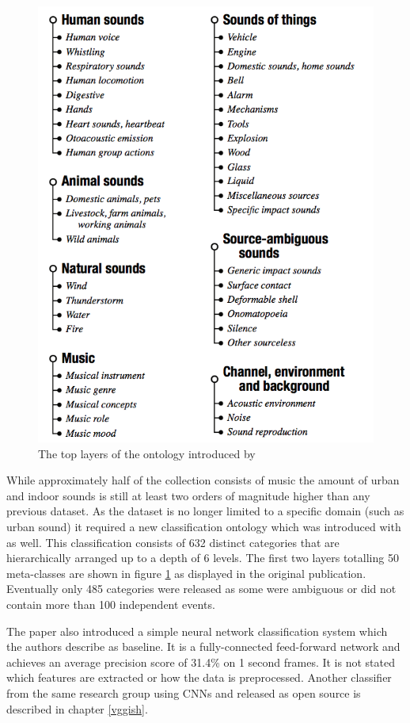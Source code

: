 \begin{figure}
    \centering
    \vspace{-10pt}
	\includegraphics[width=.45\textwidth]{./images/illustrations/audioset}
    \caption{The top layers of the ontology introduced by \cite{45857}}
	\label{fig:audioset}
\end{figure}


While approximately half of the collection consists of music the amount of urban and indoor sounds is still at least two orders of magnitude higher than any previous dataset. As the dataset is no longer limited to a specific domain (such as urban sound) it required a new classification ontology which was introduced with \cite{45857} as well. This classification consists of 632 distinct categories that are hierarchically arranged up to a depth of 6 levels. The first two layers totalling 50 meta-classes are shown in figure \ref{fig:audioset} as displayed in the original publication. Eventually only 485 categories were released as some were ambiguous or did not contain more than 100 independent events.

The paper also introduced a simple neural network classification system which the authors describe as baseline. It is a fully-connected feed-forward network and achieves an average precision score of 31.4\% on 1 second frames. It is not stated which features are extracted or how the data is preprocessed. Another classifier from the same research group using CNNs and released as open source is described in chapter \ref{vggish}.





